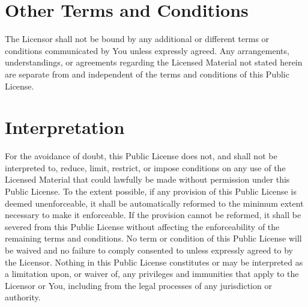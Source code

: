\section*{Other Terms and Conditions}

    The Licensor shall not be bound by any additional or different terms or conditions communicated by You unless expressly agreed.
    Any arrangements, understandings, or agreements regarding the Licensed Material not stated herein are separate from and independent of the terms and conditions of this Public License.

\section*{Interpretation}

    For the avoidance of doubt, this Public License does not, and shall not be interpreted to, reduce, limit, restrict, or impose conditions on any use of the Licensed Material that could lawfully be made without permission under this Public License.
    To the extent possible, if any provision of this Public License is deemed unenforceable, it shall be automatically reformed to the minimum extent necessary to make it enforceable. If the provision cannot be reformed, it shall be severed from this Public License without affecting the enforceability of the remaining terms and conditions.
    No term or condition of this Public License will be waived and no failure to comply consented to unless expressly agreed to by the Licensor.
    Nothing in this Public License constitutes or may be interpreted as a limitation upon, or waiver of, any privileges and immunities that apply to the Licensor or You, including from the legal processes of any jurisdiction or authority.